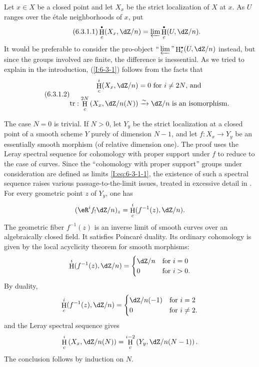 \documentclass[12pt,oneside,english]{smfbook}
\DeclareMathOperator{\h}{H}
\DeclareMathOperator{\tr}{tr}
\newcommand{\iso}{\xrightarrow\sim}
\let\oldbullet\bullet
\renewcommand{\bullet}{\textnormal{\tiny$\oldbullet$}}
\begin{document}
Let $x\in X$ be a closed point and let $X_x$ be the strict localization of $X$ at $x$. As $U$ ranges over the étale neighborhoods of $x$, put
\begin{equation*}\tag{6.3.1.1}\label{I:eq:6-3-1-1}
  \h_c^\bullet(X_x,\dZ/n) = \varprojlim \h_c^\bullet(U,\dZ/n) \text{.}
\end{equation*}
It would be preferable to consider the pro-object $\text{``}\varprojlim\text{''}\h_c^\bullet(U,\dZ/n)$ instead, but since the groups involved are finite, the difference is inessential. As we tried to explain in the introduction, (\ref{I:6-3-1}) follows from the facts that
\begin{equation*}\tag{6.3.1.2}\label{I:eq:6-3-1-2}
\begin{aligned}
  \h_c^i(X_x,\dZ/n) &= 0 \text{ for $i\ne 2N$, and} \\
  \tr : \h_c^{2N}\left(X_x,\dZ/n(N)\right) &\iso \dZ/n \text{ is an isomorphism.}
\end{aligned}
\end{equation*}

The case $N=0$ is trivial. If $N>0$, let $Y_y$ be the strict localization at a closed point of a smooth scheme $Y$ purely of dimension $N-1$, and let $f:X_x\to Y_y$ be an essentially smooth morphism (of relative dimension one). The proof uses the Leray spectral sequence for cohomology with proper support under $f$ to reduce to the case of curves. Since the ``cohomology with proper support'' groups under consideration are defined as limits \eqref{I:eq:6-3-1-1}, the existence of such a spectral sequence raises various passage-to-the-limit issues, treated in excessive detail in \cite[XVIII]{sga4}. For every geometric point $z$ of $Y_y$, one has
\[
  (\eR^if_! \dZ/n)_z = \h_c^i(f^{-1}(z),\dZ/n) \text{.}
\]
The geometric fiber $f^{-1}(z)$ is an inverse limit of smooth curves over an algebraically closed field. It satisfies Poincaré duality. Its ordinary cohomology is given by the local acyclicity theorem for smooth morphisms:
\[
  \h^i(f^{-1}(z),\dZ/n)
    = \begin{cases}
        \dZ/n & \text{for $i=0$} \\
        0     & \text{for $i>0$.}
      \end{cases}
\]
By duality,
\[
  \h_c^i(f^{-1}(z),\dZ/n)
    = \begin{cases}
        \dZ/n(-1) & \text{for $i=2$} \\
        0         & \text{for $i\ne 2$.}
      \end{cases}
\]
and the Leray spectral sequence gives
\[
  \h_c^i\left(X_x,\dZ/n(N)\right) = \h_c^{i-2}\left(Y_y,\dZ/n(N-1)\right) \text{.}
\]
The conclusion follows by induction on $N$.
\end{document}

